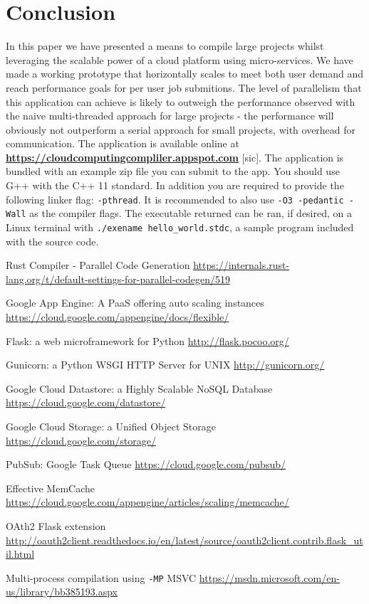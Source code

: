 \documentclass[conference]{IEEEtran}
\begin{document}
\section{Conclusion}
In this paper we have presented a means to compile large projects whilst
leveraging the scalable power of a cloud platform using micro-services. We have
made a working prototype that horizontally scales to
meet both user demand and reach performance goals for per user job submitions.
The level of parallelism that this application can achieve is likely to outweigh
the performance observed with the naive multi-threaded approach for large
projects - the performance will obviously not outperform a serial approach for
small projects, with overhead for communication.
The application is available online at
\textbf{\url{https://cloudcomputingcompliler.appspot.com}} [sic].
The application is bundled with an example zip file you can submit to the app.
You should use G++ with the C++ 11 standard. In addition you are required to provide
the following linker flag: \texttt{-pthread}. It is recommended to also use
\texttt{-O3 -pedantic -Wall} as the compiler flags. The executable returned can
be ran, if desired, on a Linux terminal with \texttt{./exename
hello\_world.stdc}, a sample program included with the source code.

\begin{thebibliography}{00}

    Rust Compiler - Parallel Code Generation
    \url{https://internals.rust-lang.org/t/default-settings-for-parallel-codegen/519}


    Google App Engine: A PaaS offering auto scaling instances
    \url{https://cloud.google.com/appengine/docs/flexible/}

    Flask: a web microframework for Python
    \url{http://flask.pocoo.org/}

    Gunicorn: a Python WSGI HTTP Server for UNIX
    \url{http://gunicorn.org/}

    Google Cloud Datastore: a Highly Scalable NoSQL Database
    \url{https://cloud.google.com/datastore/}

    Google Cloud Storage: a Unified Object Storage
    \url{https://cloud.google.com/storage/}

   PubSub: Google Task Queue
    \url{https://cloud.google.com/pubsub/}

   Effective MemCache
    \url{https://cloud.google.com/appengine/articles/scaling/memcache/} 

   OAth2 Flask extension
    \url{http://oauth2client.readthedocs.io/en/latest/source/oauth2client.contrib.flask_util.html}

 	Multi-process compilation using \texttt{-MP} MSVC
 	\url{https://msdn.microsoft.com/en-us/library/bb385193.aspx}

\end{thebibliography}
\end{document}
